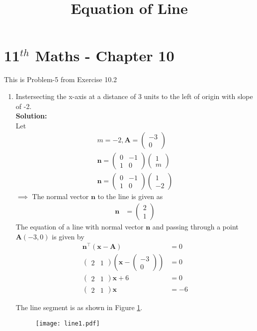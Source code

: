 \documentclass[journal,10pt,twocolumn]{article}
\providecommand{\brak}[1]{\ensuremath{\left(#1\right)}}
\newcommand{\solution}{\noindent \textbf{Solution: }}
\newcommand{\myvec}[1]{\ensuremath{\begin{pmatrix}#1\end{pmatrix}}}
\let\vec\mathbf
\begin{document}
\begin{center}
\title{\textbf{Equation  of Line}}
\date{\vspace{-5ex}} %
\maketitle
\end{center}
\setcounter{page}{1}

\section{11$^{th}$ Maths - Chapter 10}
This is Problem-5 from Exercise 10.2
\begin{enumerate}
\item Instersecting the x-axis at a distance of 3 units to the left of origin with slope of -2.
\\
\solution 
\\
Let
\begin{align}
m=-2,\vec{A}=\myvec{-3\\0}\\
\vec{n}=\myvec{0&-1\\1&0}\myvec{1\\m}\\ 
\vec{n}=\myvec{0&-1\\1&0}\myvec{1\\-2}
\end{align}
$\implies$ The normal vector $\vec{n}$ to the line is given as
\begin{align}
\vec{n} &=  \myvec{2 \\1} 
\end{align}
The equation of a line with normal vector $\vec{n}$ and passing through a point $\vec{A}(-3,0)$ is given by
\begin{align}
	\vec{n}^\top\brak{\vec{x}-\vec{A}} &= 0 \\
	\myvec { 2 & 1 } \brak{ \vec{x} - \myvec{ -3 \\ 0}} &= 0  \\
	\myvec{ 2 & 1} \vec{x} +6 &= 0 \\
        \label{eq:1}
	\myvec{ 2 & 1} \vec{x}  &= -6
\end{align}

 The line segment is as shown in Figure \ref{fig:Fig1}.
\begin{figure}[!h]
	\begin{center}
		\texttt{[image: line1.pdf]}
	\end{center}
\caption{}
\label{fig:Fig1}
\end{figure}

\end{enumerate}
\end{document}
